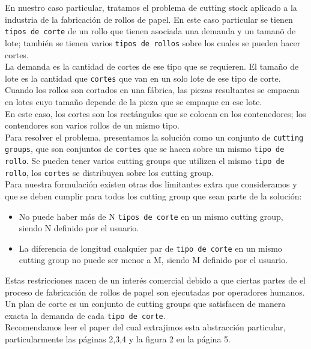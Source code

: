 \documentclass[letter,10pt]{article}
\begin{document}
En nuestro caso particular, tratamos el problema de cutting stock aplicado a la industria de
la fabricaci\'on de rollos de papel. En este caso particular se tienen \texttt{tipos de corte} de un rollo
que tienen asociada una demanda y un taman\~o de lote; tambi\'en se tienen varios \texttt{tipos de rollos} sobre los cuales se 
pueden hacer cortes.\\
\indent La demanda es la cantidad de cortes de ese tipo que se requieren. El tama\~no de lote es la cantidad que
\texttt{cortes} que van en un solo lote de ese tipo de corte. Cuando los rollos son cortados en una f\'abrica, las piezas resultantes
se empacan en lotes cuyo tama\~no depende de la pieza que se empaque en ese lote.\\
\indent En este caso, los cortes son los rect\'angulos que se colocan en los contenedores; los contendores son
varios rollos de un mismo tipo.\\
\indent Para resolver el problema, presentamos la soluci\'on como un conjunto de \texttt{cutting groups}, que son
conjuntos de \texttt{cortes} que se hacen sobre un mismo \texttt{tipo de rollo}. Se pueden tener varios cutting
groups que utilizen el mismo \texttt{tipo de rollo}, los \texttt{cortes} se distribuyen sobre los cutting group.\\
\indent Para nuestra formulaci\'on existen otras dos limitantes extra que consideramos y que se deben cumplir para
todos los cutting group que sean parte de la soluci\'on:
\begin{itemize}
  \item No puede haber m\'as de N \texttt{tipos de corte} en un mismo cutting group, siendo N definido por el usuario.
  \item La diferencia de longitud cualquier par de \texttt{tipo de corte} en un mismo cutting group no puede ser
    menor a M, siendo M definido por el usuario.
\end{itemize}
\indent Estas restricciones nacen de un inter\'es comercial debido a que ciertas partes de el proceso de fabricaci\'on
de rollos de papel son ejecutadas por operadores humanos.\\
\indent Un plan de corte es un conjunto de cutting groups que satisfacen de manera exacta la demanda de cada \texttt{tipo de corte}.\\
\indent Recomendamos leer el paper del cual extrajimos esta abstracci\'on particular,
particularmente las p\'aginas 2,3,4 y la figura 2 en la p\'agina 5.\\
\end{document}
